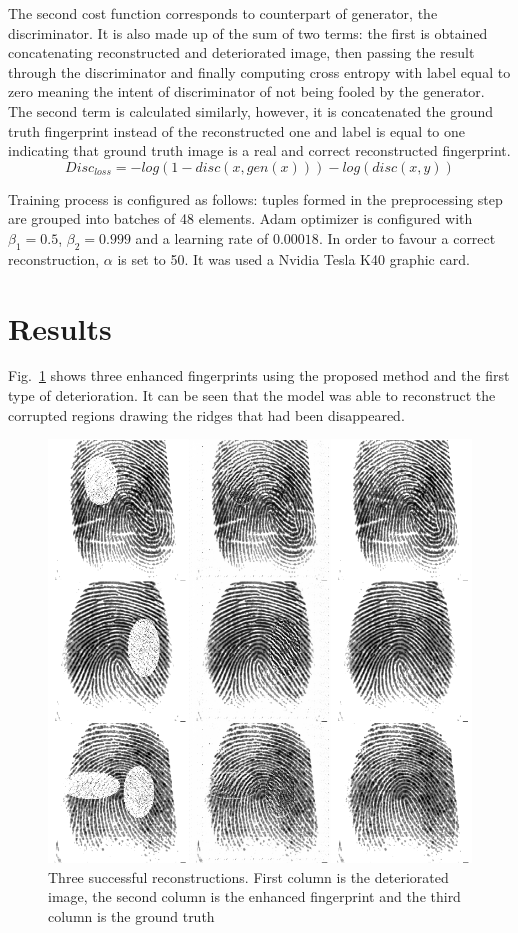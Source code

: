 \documentclass[a4paper,fleqn]{cas-dc}
\begin{document}
The second cost function corresponds to counterpart of generator, the discriminator. It is also made up of the sum of two terms: the first is obtained concatenating reconstructed and deteriorated image, then passing the result through the discriminator and finally computing cross entropy with label equal to zero meaning the intent of discriminator of not being fooled by the generator. The second term is calculated similarly, however, it is concatenated the ground truth fingerprint instead of the reconstructed one and label is equal to one indicating that ground truth image is a real and correct reconstructed fingerprint.
\begin{equation}
    Disc_{loss} = -log(1-disc(x,gen(x)))-log(disc(x,y))
\end{equation}

Training process is configured as follows: tuples formed in the preprocessing step are grouped into batches of 48 elements. Adam optimizer is configured with $\beta_{1}=0.5$, $\beta_{2}=0.999$ and a learning rate of $0.00018$. In order to favour a correct reconstruction, $\alpha$ is set to 50. It was used a Nvidia Tesla K40 graphic card.

\section{Results}
\label{sec:R}

Fig.~\ref{fig6} shows three enhanced fingerprints using the proposed method and the first type of deterioration. It can be seen that the model was able to reconstruct the corrupted regions drawing the ridges that had been disappeared.

\begin{figure}[htbp]
\centerline{\includegraphics[scale=0.28]{figs/recons_1.png}}
\caption{Three successful reconstructions. First column is the deteriorated image, the second column is the enhanced fingerprint and the third column is the ground truth}
\label{fig6}
\end{figure}
\end{document}
